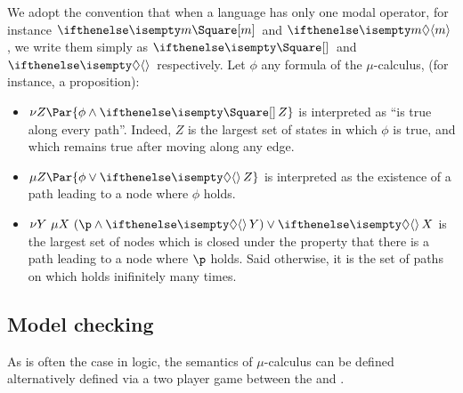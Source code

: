 \begin{example}
    We adopt the convention that when a language has only
    one modal operator, for instance $\boite{m}$ and $\diam{m}$,
    we write them simply as $\boite{}$ and $\diam{}$ respectively.
    Let $\phi$ any formula of the $\mu$-calculus, (for instance, a proposition):
    \begin{itemize}
        \item $\nu Z \Par{\phi \wedge \boite{} Z}$ is interpreted
            as ``\phi is true along every path''.
            Indeed, $Z$ is the largest set of states in which $\phi$ is true,
            and which remains true after moving along any edge.
        \item $\mu Z \Par{\phi \vee \diam{} Z}$ is interpreted
            as the existence of a path leading to a node where $\phi$ holds.
        \item $\nu Y~ \mu X~ (\p \wedge \diam{} Y) \vee \diam{} X$
            is the largest set of nodes which is closed under the property
            that there is a path leading to a node where $\p$ holds.
            Said otherwise, it is the set of paths on which \p holds inifinitely many times.
    \end{itemize}
\end{example}



\subsection{Model checking}

As is often the case in logic,
the semantics of $\mu$-calculus can
be defined alternatively defined via a two player game
between the \Verifier and \Falsifier.



